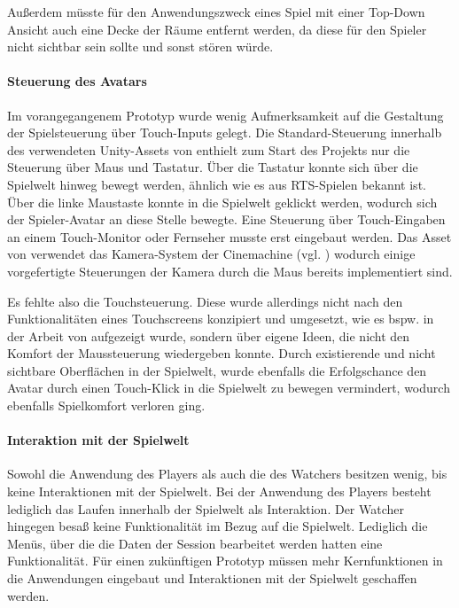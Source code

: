 Außerdem müsste für den Anwendungszweck eines Spiel mit einer Top-Down Ansicht auch eine Decke der Räume entfernt werden, da diese für den Spieler nicht sichtbar sein sollte und sonst stören würde.


\paragraph{Steuerung des Avatars}
Im vorangegangenem Prototyp wurde wenig Aufmerksamkeit auf die Gestaltung der Spielsteuerung über Touch-Inputs gelegt. Die Standard-Steuerung innerhalb des verwendeten Unity-Assets von \cite{alasl_autolevel_nodate} enthielt zum Start des Projekts nur die Steuerung über Maus und Tastatur. Über die Tastatur konnte sich über die Spielwelt hinweg bewegt werden, ähnlich wie es aus \ac{RTS}-Spielen bekannt ist. Über die linke Maustaste konnte in die Spielwelt geklickt werden, wodurch sich der Spieler-Avatar an diese Stelle bewegte. Eine Steuerung über Touch-Eingaben an einem Touch-Monitor oder Fernseher musste erst eingebaut werden. Das Asset von \cite{alasl_autolevel_nodate} verwendet das Kamera-System der Cinemachine (vgl. \cite{noauthor_about_nodate}) wodurch einige vorgefertigte Steuerungen der Kamera durch die Maus bereits implementiert sind. 

Es fehlte also die Touchsteuerung. Diese wurde allerdings nicht nach den Funktionalitäten eines Touchscreens konzipiert und umgesetzt, wie es bspw. in der Arbeit von \cite[S. 64ff]{reinhard_augmented_2022} aufgezeigt wurde, sondern über eigene Ideen, die nicht den Komfort der Maussteuerung wiedergeben konnte. Durch existierende und nicht sichtbare Oberflächen in der Spielwelt, wurde ebenfalls die Erfolgschance den Avatar durch einen Touch-Klick in die Spielwelt zu bewegen vermindert, wodurch ebenfalls Spielkomfort verloren ging.


\paragraph{Interaktion mit der Spielwelt}
Sowohl die Anwendung des Players als auch die des Watchers besitzen wenig, bis keine Interaktionen mit der Spielwelt. Bei der Anwendung des Players besteht lediglich das Laufen innerhalb der Spielwelt als Interaktion. Der Watcher hingegen besaß keine Funktionalität im Bezug auf die Spielwelt. Lediglich die Menüs, über die die Daten der Session bearbeitet werden hatten eine Funktionalität. Für einen zukünftigen Prototyp müssen mehr Kernfunktionen in die Anwendungen eingebaut und Interaktionen mit der Spielwelt geschaffen werden.

